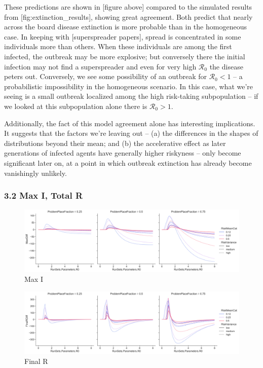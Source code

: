 These predictions are shown in {[}figure above{]} compared to the
simulated results from {[}fig:extinction\_results{]}, showing great
agreement. Both predict that nearly across the board disease extinction
is more probable than in the homogeneous case. In keeping with
{[}superspreader papers{]}, spread is concentrated in some individuals
more than others. When these individuals are among the first infected,
the outbreak may be more explosive; but conversely there the initial
infection may not find a superspreader and even for very high
\(\mathcal{R}_0\) the disease peters out. Conversely, we see some
possibility of an outbreak for \(\mathcal{R}_0 < 1\) -- a probabilistic
impossibility in the homogeneous scenario. In this case, what we're
seeing is a small outbreak localized among the high risk-taking
subpopulation -- if we looked at this subpopulation alone there is
\(\mathcal{R}_0 > 1\).

Additionally, the fact of this model agreement alone has interesting
implications. It suggests that the factors we're leaving out -- (a) the
differences in the shapes of distributions beyond their mean; and (b)
the accelerative effect as later generations of infected agents have
generally higher riskyness -- only become significant later on, at a
point in which outbreak extinction has already become vanishingly
unlikely.

\subsubsection{3.2 Max I, Total R}\label{max-i-total-r}

\begin{figure}
\centering
\includegraphics{images/MaxI.png}
\caption{Max I}
\end{figure}

\begin{figure}
\centering
\includegraphics{images/FinalR.png}
\caption{Final R}
\end{figure}


